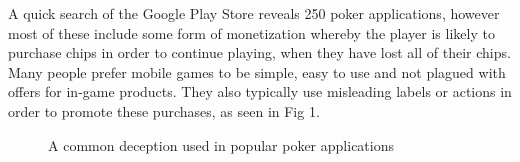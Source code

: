 \documentclass[11pt]{article}
\begin{document}
{A quick search of the Google Play Store reveals 250 poker applications, however most of these include some form of monetization whereby the player is likely to purchase chips in order to continue playing, when they have lost all of their chips. Many people prefer mobile games to be simple, easy to use and not plagued with offers for in-game products. They also typically use misleading labels or actions in order to promote these purchases, as seen in Fig 1.


\begin{center}

\begin{figure}[h]
	
	\caption{A common deception used in popular poker applications}
	
\end{figure}
	

\end{center}}
\end{document}
